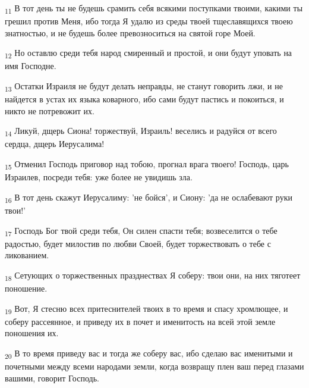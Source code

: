 \begin{tcolorbox}
\textsubscript{11} В тот день ты не будешь срамить себя всякими поступками твоими, какими ты грешил против Меня, ибо тогда Я удалю из среды твоей тщеславящихся твоею знатностью, и не будешь более превозноситься на святой горе Моей.
\end{tcolorbox}
\begin{tcolorbox}
\textsubscript{12} Но оставлю среди тебя народ смиренный и простой, и они будут уповать на имя Господне.
\end{tcolorbox}
\begin{tcolorbox}
\textsubscript{13} Остатки Израиля не будут делать неправды, не станут говорить лжи, и не найдется в устах их языка коварного, ибо сами будут пастись и покоиться, и никто не потревожит их.
\end{tcolorbox}
\begin{tcolorbox}
\textsubscript{14} Ликуй, дщерь Сиона! торжествуй, Израиль! веселись и радуйся от всего сердца, дщерь Иерусалима!
\end{tcolorbox}
\begin{tcolorbox}
\textsubscript{15} Отменил Господь приговор над тобою, прогнал врага твоего! Господь, царь Израилев, посреди тебя: уже более не увидишь зла.
\end{tcolorbox}
\begin{tcolorbox}
\textsubscript{16} В тот день скажут Иерусалиму: 'не бойся', и Сиону: 'да не ослабевают руки твои!'
\end{tcolorbox}
\begin{tcolorbox}
\textsubscript{17} Господь Бог твой среди тебя, Он силен спасти тебя; возвеселится о тебе радостью, будет милостив по любви Своей, будет торжествовать о тебе с ликованием.
\end{tcolorbox}
\begin{tcolorbox}
\textsubscript{18} Сетующих о торжественных празднествах Я соберу: твои они, на них тяготеет поношение.
\end{tcolorbox}
\begin{tcolorbox}
\textsubscript{19} Вот, Я стесню всех притеснителей твоих в то время и спасу хромлющее, и соберу рассеянное, и приведу их в почет и именитость на всей этой земле поношения их.
\end{tcolorbox}
\begin{tcolorbox}
\textsubscript{20} В то время приведу вас и тогда же соберу вас, ибо сделаю вас именитыми и почетными между всеми народами земли, когда возвращу плен ваш перед глазами вашими, говорит Господь.
\end{tcolorbox}
